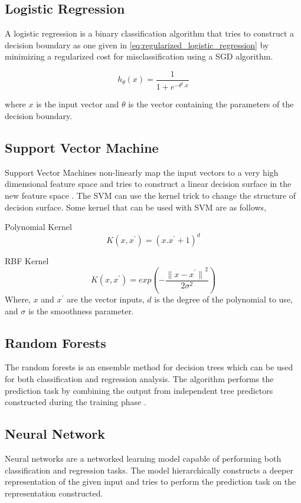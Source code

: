 \subsection{Logistic Regression}
A logistic regression is a binary classification algorithm that tries to construct a decision boundary as one given in \eqref{eq:regularized_logistic_regression} by minimizing a regularized cost for misclassification using a SGD algorithm.

\begin{equation}
    \label{eq:regularized_logistic_regression}
    h_{\theta}(x) = \frac{1}{1 + {e}^{-{\theta}^{t}. x}}
\end{equation}

where $x$ is the input vector and $\theta$ is the vector containing the parameters of the decision boundary.

\subsection{Support Vector Machine}
Support Vector Machines non-linearly map the input vectors to a very high dimensional feature space and tries to construct a linear decision surface in the new feature space \cite{cortes1995support}. The SVM can use the kernel trick to change the structure of decision surface\cite{cortes1995support}. Some kernel that can be used with SVM are as follows,

Polynomial Kernel
\begin{equation}
    \label{eq:polynomial_kernel}
    K(x, x^{'}) = {(x.x^{'} + 1)}^{d}
\end{equation}

RBF Kernel
\begin{equation}
    \label{eq:rbf_kernel}
    K(x, x^{'}) = exp(- \frac{{\lVert x - x^{'} \rVert}^{2}}{2 \sigma^{2}})
\end{equation}
Where, $x$ and $x^{'}$ are the vector inputs, $d$ is the degree of the polynomial to use, and $\sigma$ is the smoothness parameter.

\subsection{Random Forests}
The random forests\cite{breiman2001random} is an ensemble method for decision trees\cite{quinlan1986induction} which can be used for both classification and regression analysis.  The algorithm performs the prediction task by combining the output from independent tree predictors constructed during the training phase \cite{breiman2001random}. 

\subsection{Neural Network}
Neural networks are a networked learning model capable of performing both classification and regression tasks. The model hierarchically constructs a deeper representation of the given input and tries to perform the prediction task on the representation constructed. 